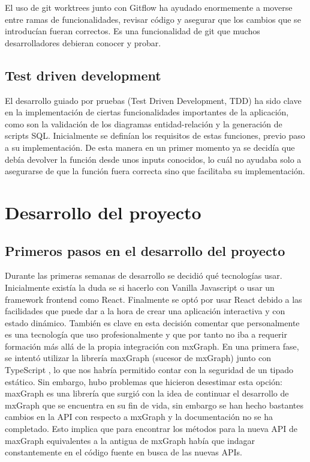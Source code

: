 El uso de git worktrees junto con Gitflow ha ayudado enormemente a moverse entre ramas de funcionalidades, revisar código y asegurar que los cambios que se introducían fueran correctos. Es una funcionalidad de git que muchos desarrolladores debieran conocer y probar.


\subsection{Test driven development}
El desarrollo guiado por pruebas (Test Driven Development, TDD) \cite{wiki:tdd} ha sido clave en la implementación de ciertas funcionalidades importantes de la aplicación, como son la validación de los diagramas entidad-relación y la generación de scripts SQL.
Inicialmente se definían los requisitos de estas funciones, previo paso a su implementación. De esta manera en un primer momento ya se decidía que debía devolver la función desde unos inputs conocidos, lo cuál no ayudaba solo a asegurarse de que la función fuera correcta sino que facilitaba su implementación.

\section{Desarrollo del proyecto}
\subsection{Primeros pasos en el desarrollo del proyecto}
Durante las primeras semanas de desarrollo se decidió qué tecnologías usar. Inicialmente existía la duda se si hacerlo con Vanilla Javascript o usar un framework frontend como React. Finalmente se optó por usar React debido a las facilidades que puede dar a la hora de crear una aplicación interactiva y con estado dinámico. También es clave en esta decisión comentar que personalmente es una tecnología que uso profesionalmente y que por tanto no iba a requerir formación más allá de la propia integración con mxGraph.
En una primera fase, se intentó utilizar la librería maxGraph (sucesor de mxGraph) junto con TypeScript 
\cite{typescript}, lo que nos habría permitido contar con la seguridad de un tipado estático. Sin embargo, hubo problemas que hicieron desestimar esta opción: maxGraph es una librería que surgió con la idea de continuar el desarrollo de mxGraph que se encuentra en su fin de vida, sin embargo se han hecho bastantes cambios en la API con respecto a mxGraph y la documentación no se ha completado. Esto implica que para encontrar los métodos para la nueva API de maxGraph equivalentes a la antigua de mxGraph había que indagar constantemente en el código fuente en busca de las nuevas APIs.

